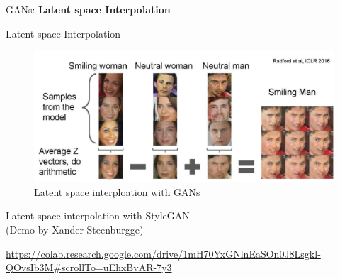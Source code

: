 \begin{frame}{}
    \LARGE GANs: \textbf{Latent space Interpolation}
\end{frame}

\begin{frame}[allowframebreaks]{Latent space Interpolation}
\begin{figure}
    \centering
    \includegraphics[height=0.9\textheight, width=\textwidth, keepaspectratio]{images/gan/gan_latent.png}
    \caption*{Latent space interploation with GANs}
\end{figure}
\framebreak
\centering
Latent space interpolation with StyleGAN\\
\centering
(Demo by Xander Steenburgge)\\

\vspace{\baselineskip}

\centering
\href{https://colab.research.google.com/drive/1mH70YxGNlnEaSOn0J8Lsgkl-QOvsIb3M#scrollTo=uEhxBvAR-7y3}{https://colab.research.google.com/drive/1mH70YxGNlnEaSOn0J8Lsgkl-QOvsIb3M#scrollTo=uEhxBvAR-7y3}
\end{frame}